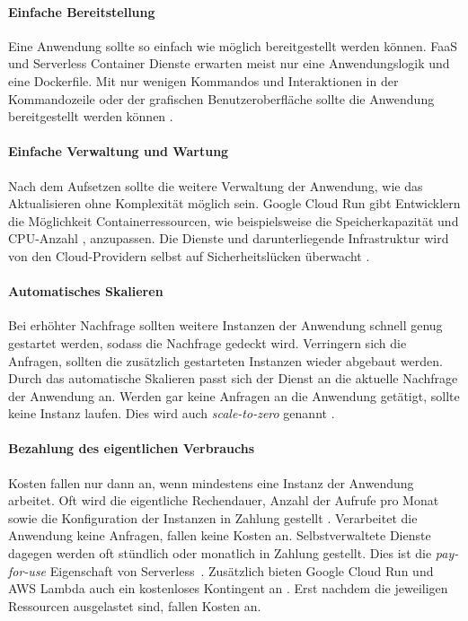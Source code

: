 \paragraph{Einfache Bereitstellung} Eine Anwendung sollte so einfach
wie möglich bereitgestellt werden können.
FaaS und Serverless Container Dienste erwarten meist nur eine
Anwendungslogik und eine Dockerfile.
Mit nur wenigen Kommandos und Interaktionen in der Kommandozeile oder
der grafischen Benutzeroberfläche sollte die Anwendung
bereitgestellt werden können \cite{ServerlessTrends}.

\paragraph{Einfache Verwaltung und Wartung} 
Nach dem Aufsetzen sollte die weitere Verwaltung der Anwendung, wie das Aktualisieren
ohne Komplexität möglich sein. Google Cloud Run gibt Entwicklern die Möglichkeit
Containerressourcen, wie beispielsweise die Speicherkapazität \cite{CloudRunMemLimits}
und CPU-Anzahl \cite{CloudRunCpuAlloc}, anzupassen. Die Dienste und darunterliegende
Infrastruktur wird von den Cloud-Providern selbst auf Sicherheitslücken überwacht \cite{ServerlessTrends}.

\paragraph{Automatisches Skalieren} Bei erhöhter Nachfrage sollten weitere Instanzen der Anwendung
schnell genug gestartet werden, sodass die Nachfrage gedeckt wird.
Verringern sich die Anfragen, sollten die zusätzlich gestarteten Instanzen wieder abgebaut werden.
Durch das automatische Skalieren passt sich der Dienst an die aktuelle Nachfrage der Anwendung an.
Werden gar keine Anfragen an die Anwendung getätigt, sollte keine Instanz laufen.
Dies wird auch \emph{scale-to-zero} genannt \cite{ServerlessTrends}.

\paragraph{Bezahlung des eigentlichen Verbrauchs} Kosten fallen nur dann an, wenn mindestens eine
Instanz der Anwendung arbeitet. Oft wird die eigentliche Rechendauer, Anzahl der
Aufrufe pro Monat sowie die Konfiguration der Instanzen in Zahlung gestellt \cite{ServerlessTrends}.
Verarbeitet die Anwendung keine Anfragen, fallen keine Kosten an.
Selbstverwaltete Dienste dagegen werden oft stündlich oder monatlich in Zahlung gestellt.
Dies ist die \emph{pay-for-use} Eigenschaft von Serverless \cite{Firecracker}.
Zusätzlich bieten Google Cloud Run und AWS Lambda auch ein kostenloses Kontingent an
\cite{CloudRunPricing} \cite{AWSLambda}. Erst nachdem die jeweiligen Ressourcen
ausgelastet sind, fallen Kosten an.

